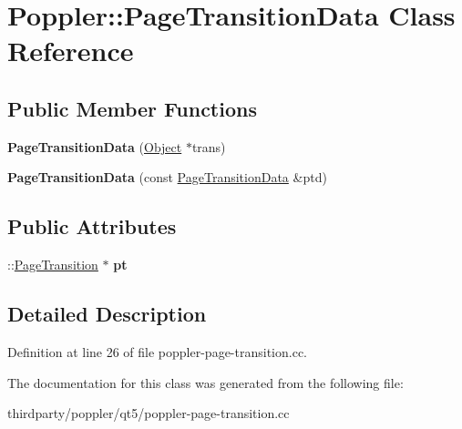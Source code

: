 \hypertarget{class_poppler_1_1_page_transition_data}{}\section{Poppler\+:\+:Page\+Transition\+Data Class Reference}
\label{class_poppler_1_1_page_transition_data}
\subsection*{Public Member Functions}
\begin{DoxyCompactItemize}
\item 
\mbox{\label{class_poppler_1_1_page_transition_data_a1f128ea7d4b02a260d5550587d699635}} 
{\bfseries Page\+Transition\+Data} (\hyperlink{class_object}{Object} $\ast$trans)
\item 
\mbox{\label{class_poppler_1_1_page_transition_data_aa3db5f6a46d9dd1992f8321df65ff479}} 
{\bfseries Page\+Transition\+Data} (const \hyperlink{class_poppler_1_1_page_transition_data}{Page\+Transition\+Data} \&ptd)
\end{DoxyCompactItemize}
\subsection*{Public Attributes}
\begin{DoxyCompactItemize}
\item 
\mbox{\label{class_poppler_1_1_page_transition_data_a5fceeff41e09b2e99afe09369d806745}} 
\+::\hyperlink{class_poppler_1_1_page_transition}{Page\+Transition} $\ast$ {\bfseries pt}
\end{DoxyCompactItemize}


\subsection{Detailed Description}


Definition at line 26 of file poppler-\/page-\/transition.\+cc.



The documentation for this class was generated from the following file\+:\begin{DoxyCompactItemize}
\item 
thirdparty/poppler/qt5/poppler-\/page-\/transition.\+cc\end{DoxyCompactItemize}
